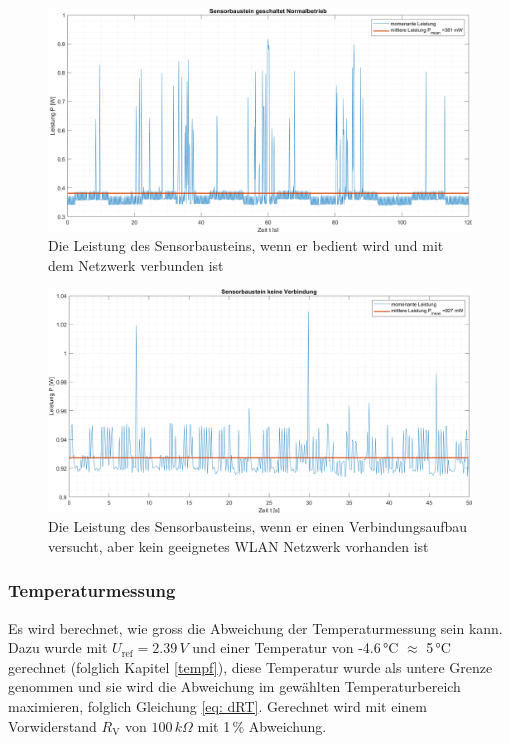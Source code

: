 \begin{figure}[H]
	\centering
	\includegraphics[width=1\textwidth]{graphics/Sensorbaustein_geschaltet.png}
	\caption{Die Leistung des Sensorbausteins, wenn er bedient wird und mit dem Netzwerk verbunden ist}
	\label{pic: Sensorbaustein_geschaltet}
\end{figure}

\begin{figure}[H]
	\centering
	\includegraphics[width=1\textwidth]{graphics/Sensorbaustein_keine_Verbindung.png}
	\caption{Die Leistung des Sensorbausteins, wenn er einen Verbindungsaufbau versucht, aber kein geeignetes WLAN Netzwerk vorhanden ist}
	\label{pic: Sensorbaustein_keine_Verbindung}
\end{figure}




\subsubsection{Temperaturmessung}
Es wird berechnet, wie gross die Abweichung der Temperaturmessung sein kann. Dazu wurde mit $U_\text{ref} = 2.39\,V$ und einer Temperatur von -4.6\,°C $\approx$ 5\,°C  gerechnet (folglich Kapitel \ref{tempf}), diese Temperatur wurde als untere Grenze genommen und sie wird die Abweichung im gewählten Temperaturbereich maximieren, folglich Gleichung \ref{eq: dRT}. Gerechnet wird mit einem Vorwiderstand $R_\text{V}$ von $100\,k\Omega$ mit 1\,\% Abweichung.  

